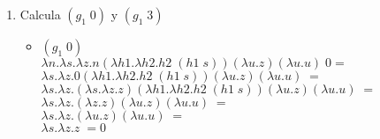 \documentclass[11pt, a4paper]{report}
\begin{document}
\begin{enumerate}[label=\alph*)]

\item Calcula $(g_{1}\; 0)$ y $(g_{1}\; 3)$
	\begin{itemize}
	\item $(g_{1}\; 0)$ \\
    $\lambda n.\lambda s. \lambda z. n (\lambda h1. \lambda h2. h2\;(h1\;s)) (\lambda 
    u.z) (\lambda u. u)\; 0 =$\\
    $\lambda s. \lambda z. 0 (\lambda h1. \lambda h2. h2\;(h1\;s)) (\lambda 
    u.z) (\lambda u. u)\; =$\\
    $\lambda s. \lambda z. (\lambda s.\lambda z. z) (\lambda h1. \lambda h2. h2\;(h1\;s)) 
    (\lambda u.z) (\lambda u. u)\; =$\\
    $\lambda s. \lambda z. (\lambda z. z) (\lambda u.z) (\lambda u. u)\; =$\\
    $\lambda s. \lambda z. (\lambda u.z) (\lambda u. u)\; =$\\
    $\lambda s. \lambda z. z\; = 0$\\
    

\end{itemize}
\end{enumerate}
\end{document}
